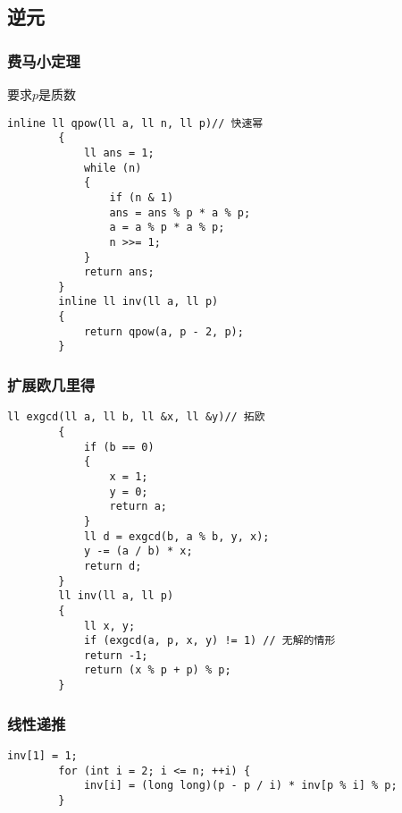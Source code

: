 \documentclass[12pt, a4paper]{ctexart}
\begin{document}
	\subsection{逆元}
	\subsubsection{费马小定理}
	要求$p$是质数
	\begin{lstlisting}[caption={}]
		inline ll qpow(ll a, ll n, ll p)// 快速幂
		{
			ll ans = 1;
			while (n)
			{
				if (n & 1)
				ans = ans % p * a % p;
				a = a % p * a % p;
				n >>= 1;
			}
			return ans;
		}
		inline ll inv(ll a, ll p)
		{
			return qpow(a, p - 2, p);
		}
	\end{lstlisting}
	\subsubsection{扩展欧几里得}
	\begin{lstlisting}[caption={}]
		ll exgcd(ll a, ll b, ll &x, ll &y)// 拓欧
		{
			if (b == 0)
			{
				x = 1;
				y = 0;
				return a;
			}
			ll d = exgcd(b, a % b, y, x);
			y -= (a / b) * x;
			return d;
		}
		ll inv(ll a, ll p)
		{
			ll x, y;
			if (exgcd(a, p, x, y) != 1) // 无解的情形
			return -1;
			return (x % p + p) % p;
		}
	\end{lstlisting}
	\subsubsection{线性递推}
	\begin{lstlisting}[caption={}]
		inv[1] = 1;
		for (int i = 2; i <= n; ++i) {
			inv[i] = (long long)(p - p / i) * inv[p % i] % p;
		}
	\end{lstlisting}
\end{document}
